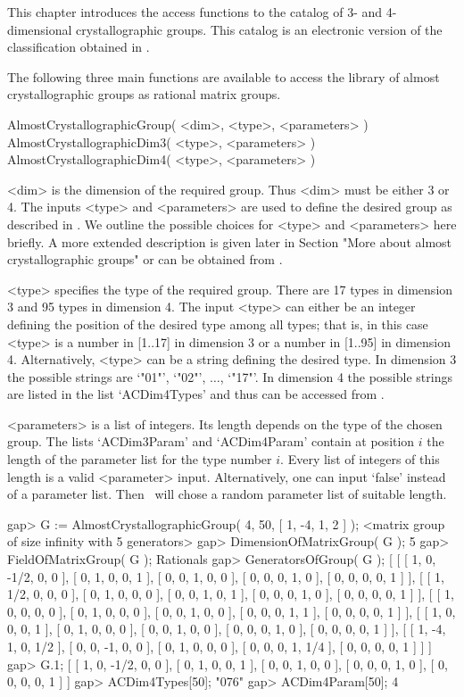 
This chapter introduces the access functions to the catalog of
3- and 4-dimensional crystallographic groups. This catalog is an
electronic version of the classification obtained in \cite{KD}.


The following three main functions are available to access the library 
of almost crystallographic groups as rational matrix groups.

\> AlmostCrystallographicGroup( <dim>, <type>, <parameters> )
\> AlmostCrystallographicDim3( <type>, <parameters> )
\> AlmostCrystallographicDim4( <type>, <parameters> )

<dim> is the dimension of the required group. Thus <dim> must be 
either 3 or 4. The inputs <type> and <parameters> are used to define
the desired group as described in \cite{KD}. We outline the possible
choices for <type> and <parameters> here briefly. A more extended 
description is given later in Section "More about almost crystallographic 
groups" or can be obtained from \cite{KD}.

<type> specifies the type of the required group. There are 17 types
in dimension 3 and 95 types in dimension 4. The input <type> can either
be an integer  defining the position of the desired type among all types;
that is, in this case <type> is a number in [1..17] in dimension 3 or a
number in [1..95] in dimension 4. Alternatively, <type> can be a string
defining the desired type. In dimension 3 the possible strings are 
`"01"', `"02"', $\ldots$, `"17"'. In dimension 4 the possible strings 
are listed in the list `ACDim4Types' and thus can be accessed from \GAP.

<parameters> is a list of integers. Its length depends on the type of 
the chosen group. The lists `ACDim3Param' and `ACDim4Param' contain
at position $i$ the length of the parameter list for the type number $i$.
Every list of integers of this length is a valid <parameter> input.
Alternatively, one can input `false' instead of a parameter list. Then 
\GAP\ will chose a random parameter list of suitable length.

\beginexample
gap> G := AlmostCrystallographicGroup( 4, 50, [ 1, -4, 1, 2 ] );
<matrix group of size infinity with 5 generators>
gap> DimensionOfMatrixGroup( G );
5
gap> FieldOfMatrixGroup( G );
Rationals
gap> GeneratorsOfGroup( G );
[ [ [ 1, 0, -1/2, 0, 0 ], [ 0, 1, 0, 0, 1 ], [ 0, 0, 1, 0, 0 ], 
      [ 0, 0, 0, 1, 0 ], [ 0, 0, 0, 0, 1 ] ], 
  [ [ 1, 1/2, 0, 0, 0 ], [ 0, 1, 0, 0, 0 ], [ 0, 0, 1, 0, 1 ], 
      [ 0, 0, 0, 1, 0 ], [ 0, 0, 0, 0, 1 ] ], 
  [ [ 1, 0, 0, 0, 0 ], [ 0, 1, 0, 0, 0 ], [ 0, 0, 1, 0, 0 ], 
      [ 0, 0, 0, 1, 1 ], [ 0, 0, 0, 0, 1 ] ], 
  [ [ 1, 0, 0, 0, 1 ], [ 0, 1, 0, 0, 0 ], [ 0, 0, 1, 0, 0 ], 
      [ 0, 0, 0, 1, 0 ], [ 0, 0, 0, 0, 1 ] ], 
  [ [ 1, -4, 1, 0, 1/2 ], [ 0, 0, -1, 0, 0 ], [ 0, 1, 0, 0, 0 ], 
      [ 0, 0, 0, 1, 1/4 ], [ 0, 0, 0, 0, 1 ] ] ]
gap> G.1;
[ [ 1, 0, -1/2, 0, 0 ], [ 0, 1, 0, 0, 1 ], [ 0, 0, 1, 0, 0 ], 
  [ 0, 0, 0, 1, 0 ], [ 0, 0, 0, 0, 1 ] ]
gap> ACDim4Types[50];
"076"
gap> ACDim4Param[50];
4
\endexample

